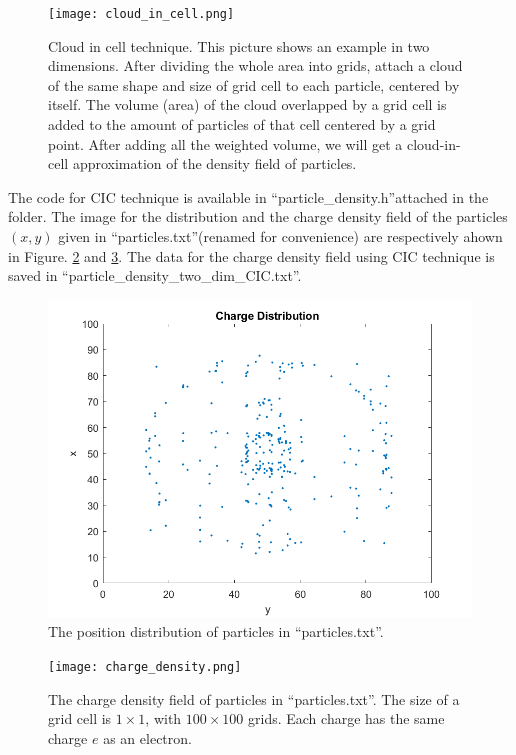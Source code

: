 \documentclass[12pt, graphicx]{article}
\begin{document}
\begin{figure}[ht]
\centering
\texttt{[image: cloud\_in\_cell.png]}
\caption{Cloud in cell technique. This picture shows an example in two dimensions. After dividing the whole area into grids, attach a cloud of the same shape and size of grid cell to each particle, centered by itself. The volume (area) of the cloud overlapped by a grid cell is added to the amount of particles of that cell centered by a grid point. After adding all the weighted volume, we will get a cloud-in-cell approximation of the density field of particles.}
\label{fig:CIC}
\end{figure}

The code for CIC technique is available in \textquotedblleft particle\_density.h\textquotedblright attached in the folder. The image for the distribution and the charge density field of the particles $(x,y)$ given in \textquotedblleft particles.txt\textquotedblright (renamed for convenience) are respectively ahown in Figure. \ref{fig:charge} and \ref{fig:density}. The data for the charge density field using CIC technique is saved in \textquotedblleft particle\_density\_two\_dim\_CIC.txt\textquotedblright.

\begin{figure}[ht]
\centering
\includegraphics[width = 120mm]{charges.png}
\caption{The position distribution of particles in \textquotedblleft particles.txt\textquotedblright.}
\label{fig:charge}
\end{figure}

\clearpage

\begin{figure}[ht]
\centering
\texttt{[image: charge\_density.png]}
\caption{The charge density field of particles in \textquotedblleft particles.txt\textquotedblright. The size of a grid cell is $1\times1$, with $100\times100$ grids. Each charge has the same charge $e$ as an electron.}
\label{fig:density}
\end{figure}
\end{document}
